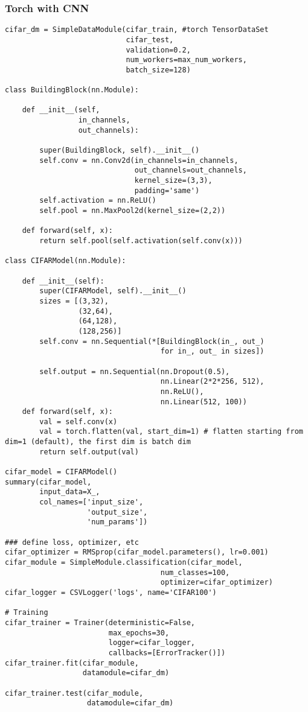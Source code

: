 \documentclass[
  letterpaper,
  DIV=11,
  numbers=noendperiod]{scrreprt}
\begin{document}
\subsubsection{Torch with CNN}\label{torch-with-cnn}

\begin{verbatim}
cifar_dm = SimpleDataModule(cifar_train, #torch TensorDataSet
                            cifar_test,
                            validation=0.2,
                            num_workers=max_num_workers,
                            batch_size=128)

class BuildingBlock(nn.Module):

    def __init__(self,
                 in_channels,
                 out_channels):

        super(BuildingBlock, self).__init__()
        self.conv = nn.Conv2d(in_channels=in_channels,
                              out_channels=out_channels,
                              kernel_size=(3,3),
                              padding='same')
        self.activation = nn.ReLU()
        self.pool = nn.MaxPool2d(kernel_size=(2,2))

    def forward(self, x):
        return self.pool(self.activation(self.conv(x)))

class CIFARModel(nn.Module):

    def __init__(self):
        super(CIFARModel, self).__init__()
        sizes = [(3,32),
                 (32,64),
                 (64,128),
                 (128,256)]
        self.conv = nn.Sequential(*[BuildingBlock(in_, out_)
                                    for in_, out_ in sizes])

        self.output = nn.Sequential(nn.Dropout(0.5),
                                    nn.Linear(2*2*256, 512),
                                    nn.ReLU(),
                                    nn.Linear(512, 100))
    def forward(self, x):
        val = self.conv(x)
        val = torch.flatten(val, start_dim=1) # flatten starting from dim=1 (default), the first dim is batch dim
        return self.output(val)

cifar_model = CIFARModel()
summary(cifar_model,
        input_data=X_,
        col_names=['input_size',
                   'output_size',
                   'num_params'])

### define loss, optimizer, etc
cifar_optimizer = RMSprop(cifar_model.parameters(), lr=0.001)
cifar_module = SimpleModule.classification(cifar_model,
                                    num_classes=100,
                                    optimizer=cifar_optimizer)
cifar_logger = CSVLogger('logs', name='CIFAR100')

# Training
cifar_trainer = Trainer(deterministic=False,
                        max_epochs=30,
                        logger=cifar_logger,
                        callbacks=[ErrorTracker()])
cifar_trainer.fit(cifar_module,
                  datamodule=cifar_dm)

cifar_trainer.test(cifar_module,
                   datamodule=cifar_dm)
                   
\end{verbatim}
\end{document}
